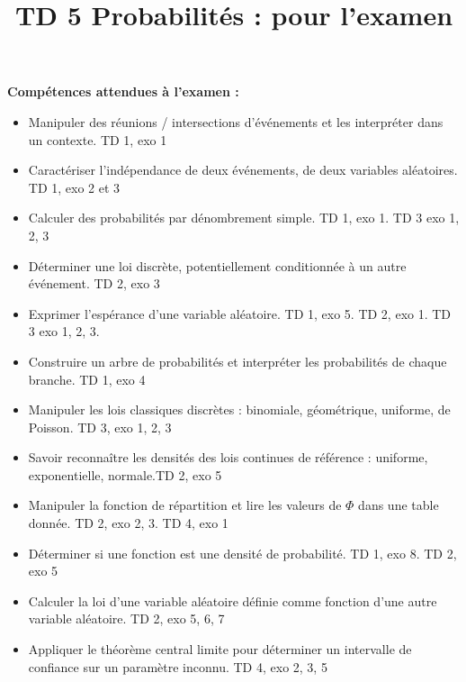 \documentclass[10pt]{article}
\title{TD 5 Probabilités : pour l'examen}
\author{}
\date{}
\begin{document}
\sffamily
\maketitle

\textbf{Compétences attendues à l'examen :}
\begin{itemize}
    \item[$\bullet$] Manipuler des réunions / intersections d'événements et les interpréter dans un contexte. \dotfill TD 1, exo 1
    \vspace{0.5em}
    \item[$\bullet$] Caractériser l'indépendance de deux événements, de deux variables aléatoires. \dotfill TD 1, exo 2 et 3
    \vspace{0.5em}
    \item[$\bullet$] Calculer des probabilités par dénombrement simple. \dotfill TD 1, exo 1. TD 3 exo 1, 2, 3
    \vspace{0.5em}
    \item[$\bullet$] Déterminer une loi discrète, potentiellement conditionnée à un autre événement. \dotfill TD 2, exo 3
    \vspace{0.5em}
    \item[$\bullet$] Exprimer l'espérance d'une variable aléatoire. \dotfill TD 1, exo 5. TD 2, exo 1. TD 3 exo 1, 2, 3. 
    \vspace{0.5em}
    \item[$\bullet$] Construire un arbre de probabilités et interpréter les probabilités de chaque branche. \dotfill TD 1, exo 4
    \vspace{0.5em}
    \item[$\bullet$] Manipuler les lois classiques discrètes : binomiale, géométrique, uniforme, de Poisson. \dotfill TD 3, exo 1, 2, 3
    \vspace{0.5em}
    \item[$\bullet$] Savoir reconnaître les densités des lois continues de référence : uniforme, exponentielle, normale.\dotfill TD 2, exo 5
    \vspace{0.5em}
    \item[$\bullet$] Manipuler la fonction de répartition et lire les valeurs de $\Phi$ dans une table donnée. \dotfill TD 2, exo 2, 3. TD 4, exo 1
    \vspace{0.5em}
    \item[$\bullet$] Déterminer si une fonction est une densité de probabilité. \dotfill TD 1, exo 8. TD 2, exo 5
    \vspace{0.5em}
    \item[$\bullet$] Calculer la loi d'une variable aléatoire définie comme fonction d'une autre variable aléatoire. \dotfill TD 2, exo 5, 6, 7
    \vspace{0.5em}
    \item[$\bullet$] Appliquer le théorème central limite pour déterminer un intervalle de confiance sur un paramètre inconnu. \dotfill TD 4, exo 2, 3, 5
\end{itemize}
\end{document}
